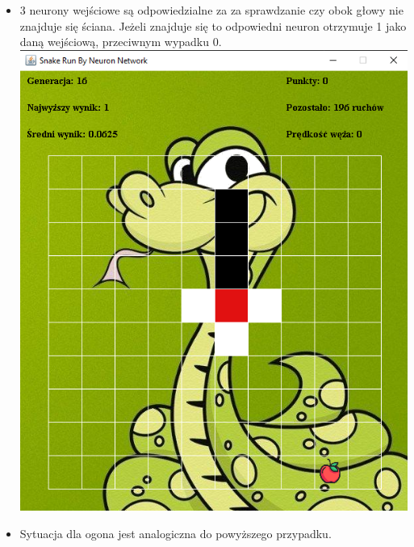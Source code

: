 \documentclass{article}
\begin{document}
        \begin{itemize}
            \item 3 neurony wejściowe są odpowiedzialne za za sprawdzanie czy obok głowy nie znajduje się ściana. Jeżeli znajduje się to odpowiedni neuron otrzymuje 1 jako daną wejściową, przeciwnym wypadku 0.\\\includegraphics[scale = 1.9]{jablko}
            \item Sytuacja dla ogona jest analogiczna do powyższego przypadku.

\end{itemize}
\end{document}
